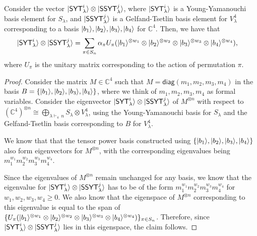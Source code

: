 \documentclass[11pt]{article}
\DeclarePairedDelimiter\ket{\lvert}{\rangle}
\begin{document}
\begin{lemma}\label{lem:wtvector}
    
    Consider the vector  $\ket{\mathsf{SYT}^i_\lambda} \otimes \ket{\mathsf{SSYT}^j_\lambda}$, where $\ket{\mathsf{SYT}^i_\lambda}$ is a Young-Yamanouchi basis element for $S_\lambda$, and $\ket{\mathsf{SSYT}^j_\lambda}$ is a Gelfand-Tsetlin basis element for $V^4_\lambda$ corresponding to a basis $\ket{b_1},\ket{b_2},\ket{b_3},\ket{b_4}$ for $\mathbb C^4$. Then, we have that
    \begin{align*}
        \ket{\mathsf{SYT}^i_\lambda} \otimes \ket{\mathsf{SSYT}^j_\lambda} &= \sum_{\pi \in S_n} \alpha_{\pi} U_{\pi}(\ket{b_1}^{\otimes w_1} \otimes \ket{b_2}^{\otimes w_2} \otimes \ket{b_3}^{\otimes w_3} \otimes \ket{b_4}^{\otimes w_4}),
    \end{align*}
where $U_{\pi}$ is the unitary matrix corresponding to the action of permutation $\pi$. 
\end{lemma}
\begin{proof}
    Consider the matrix $M \in \mathbb{C}^4$ such that $M = \mathsf{diag}(m_1, m_2, m_3, m_4)$ in the basis $B = \{\ket{b_1}, \ket{b_2}, \ket{b_3}, \ket{b_4}\}$, where we think of $m_1, m_2, m_3, m_4$ as formal variables. Consider the eigenvector $\ket{\mathsf{SYT}^i_\lambda} \otimes \ket{\mathsf{SSYT}^j_\lambda}$ of $M^{\otimes n}$ with respect to $(\mathbb{C}^4)^{\otimes n} \cong \bigoplus_{\lambda \vdash_4\, n} S_{\lambda} \otimes V^4_{\lambda}$, using the Young-Yamanouchi basis for $S_{\lambda}$ and the Gelfand-Tsetlin basis corresponding to $B$ for $V^4_{\lambda}$.
    
    We know that that the tensor power basis constructed using $\{\ket{b_1},\ket{b_2},\ket{b_3},\ket{b_4}\}$ also form eigenvectors for $M^{\otimes n}$, with the corresponding eigenvalues being $m_1^{w_1}m_2^{w_2}m_3^{w_3}m_4^{w_4}$. 
    
    
    Since the eigenvalues of $M^{\otimes n}$ remain unchanged for any basis, we know that the eigenvalue for $\ket{\mathsf{SYT}^i_\lambda} \otimes \ket{\mathsf{SSYT}^j_\lambda}$ has to be of the form $m_1^{w_1}m_2^{w_2}m_3^{w_3}m_4^{w_4}$ for $w_1, w_2, w_3, w_4 \geq 0$. We also know that the eigenspace of $M^{\otimes n}$ corresponding to this eigenvalue is equal to the span of $\{U_{\pi}(\ket{b_1}^{\otimes w_1} \otimes \ket{b_2}^{\otimes w_2} \otimes \ket{b_3}^{\otimes w_3} \otimes \ket{b_4}^{\otimes w_4})\}_{\pi \in S_n}$. Therefore, since $\ket{\mathsf{SYT}^i_\lambda} \otimes \ket{\mathsf{SSYT}^j_\lambda}$ lies in this eigenspace, the claim follows.
\end{proof}
\end{document}
